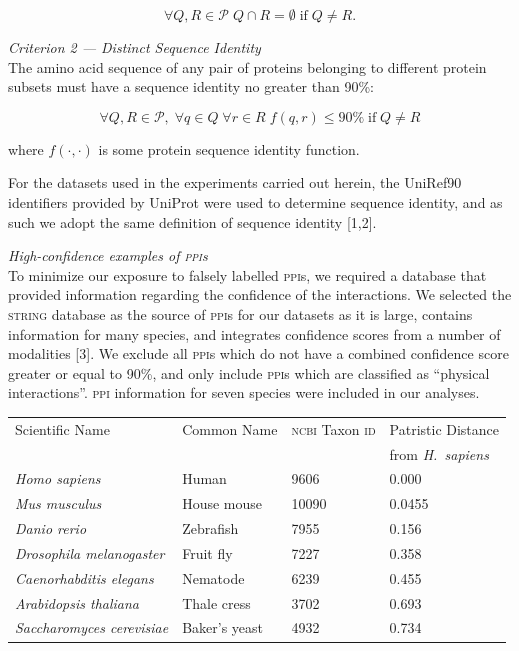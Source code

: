 $$
\forall Q, R \in \mathcal{P} \; Q \cap R = \emptyset \; \textrm{if} \; Q \neq R.
$$

\textit{Criterion 2 --- Distinct Sequence Identity}\\
The amino acid sequence of any pair of proteins belonging to different protein subsets must have a sequence identity no greater than 90\%:

$$
\forall Q, R \in \mathcal{P}, \; \forall q \in Q \; \forall r \in R \; f(q,r) \leq 90\% \; \textrm{if} \; Q \neq R
$$

where $f(\cdot,\cdot)$ is some protein sequence identity function.

For the datasets used in the experiments carried out herein, the UniRef90 identifiers provided by UniProt were used to determine sequence identity, and as such we adopt the same definition of sequence identity [1,2].

\textit{High-confidence examples of \textsc{ppi}s}\\
To minimize our exposure to falsely labelled \textsc{ppi}s, we required a database that provided information regarding the confidence of the interactions. We selected the \textsc{string} database as the source of \textsc{ppi}s for our datasets as it is large, contains information for many species, and integrates confidence scores from a number of modalities [3]. We exclude all \textsc{ppi}s which do not have a combined confidence score greater or equal to 90\%, and only include \textsc{ppi}s which are
classified as ``physical interactions''. \textsc{ppi} information for seven species were included in our analyses.

\begin{table}[h]
	 {\begin{tabular}{@{}llll@{}}\toprule 
			Scientific Name & Common Name & \textsc{ncbi} Taxon \textsc{id} & Patristic Distance\\
                            &                &                     & from \textit{H.~sapiens}\\\midrule
			\textit{Homo sapiens} & Human & 9606 & 0.000 \\
            \textit{Mus musculus} & House mouse & 10090 & 0.0455 \\
            \textit{Danio rerio} & Zebrafish & 7955 & 0.156 \\
            \textit{Drosophila melanogaster} & Fruit fly & 7227 & 0.358 \\
            \textit{Caenorhabditis elegans} & Nematode & 6239 & 0.455 \\
            \textit{Arabidopsis thaliana} & Thale cress & 3702 & 0.693 \\
            \textit{Saccharomyces cerevisiae} & Baker's yeast & 4932 & 0.734 \\
			\midrule
	\end{tabular}}{}
\end{table}

